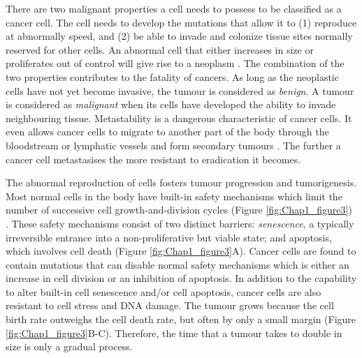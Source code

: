 There are two malignant properties a cell needs to possess to be classified as a cancer cell. The cell needs to develop the mutations that allow it to (1) reproduce at abnormally speed, and (2) be able to invade and colonize tissue sites normally reserved for other cells. An abnormal cell that either increases in size or proliferates out of control will give rise to a neoplasm \cite{alberts2018molecular, hanahan2000hallmarks}. The combination of the two properties contributes to the fatality of cancers. As long as the neoplastic cells have not yet become invasive, the tumour is considered as \textit{benign}. A tumour is considered as \textit{malignant} when its cells have developed the ability to invade neighbouring tissue. Metastability is a dangerous characteristic of cancer cells. It even allows cancer cells to migrate to another part of the body through the bloodstream or lymphatic vessels and form secondary tumours \cite{alberts2018molecular}. The further a cancer cell metastasises the more resistant to eradication it becomes.   

The abnormal reproduction of cells fosters tumour progression and tumorigenesis. Most normal cells in the body have built-in safety mechanisms which limit the number of successive cell growth-and-division cycles (Figure \ref{fig:Chap1_figure3}) \cite{hanahan2000hallmarks, hanahan2011hallmarksnext}. These safety mechanisms consist of two distinct barriers: \textit{senescence}, a typically irreversible entrance into a non-proliferative but viable state; and apoptosis, which involves cell death (Figure \ref{fig:Chap1_figure3}A). Cancer cells are found to contain mutations that can disable normal safety mechanisms which is either an increase in cell division or an inhibition of apoptosis. In addition to the capability to alter built-in cell senescence and/or cell apoptosis, cancer cells are also resistant to cell stress and DNA damage. The tumour grows because the cell birth rate outweighs the cell death rate, but often by only a small margin (Figure \ref{fig:Chap1_figure3}B-C). Therefore, the time that a tumour takes to double in size is only a gradual process.

